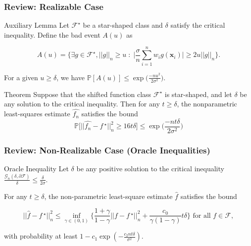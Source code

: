 \documentclass[11pt]{beamer}
\newcommand{\Prob}{\mathbb{P}}
\newcommand{\bx}{\mathbf{x}}
\newcommand{\cF}{\mathcal{F}}
\newcommand{\cG}{\mathcal{G}}
\newcommand{\fstar}{f\,^\star}
\newcommand{\fhat}{\widehat{f}}
\begin{document}
	\begin{frame}
		\frametitle{Review: Realizable Case}
		\begin{block}{Auxiliary Lemma}
			Let $\cF^\star$ be a star-shaped class and $\delta$ satisfy the critical inequality.  Define the bad event $A(u)$ as
			\begin{small}
				
				\vspace{-0.3cm}
				\begin{equation*}
				A(u) = \Bigg\{\exists g \in \cF^\star, ||g||_n \geq u \;:\; \Big|\frac{\sigma}{n}\sum_{i = 1}^{n} w_i g(\bx_i)\Big|\geq 2u ||g||_n\Bigg\}.
				\end{equation*}
			\end{small}
			\vspace{-0.3cm}
			
			For a given $u \geq \delta$, we have 
			$\Prob[A(u)]\leq \exp\big(\frac{-nu^2}{2\sigma^2}\big)$.
		\end{block}		
		\begin{block}{Theorem}
			Suppose that the shifted function class $\cF^\star$ is star-shaped, and let $\delta$ be any solution to the critical inequality. Then for any $t \geq \delta$, the nonparametric least-squares estimate $\widehat{f_n}$ satisfies the bound
			\begin{equation*}
			\Prob\big[||\widehat{f_n} - \fstar ||_n^2 \geq 16t\delta\big] \leq \exp\Big(\frac{-nt\delta}{2\sigma^2}\Big)
			\end{equation*}
		\end{block}		
	\end{frame}	

	\begin{frame}
	\frametitle{Review: Non-Realizable Case (Oracle Inequalities)}
	\begin{block}{Oracle Inequality}
		Let $\delta$ be any positive solution to the critical inequality
		$\frac{\cG_n(\delta, \partial \cF)}{\delta} \leq \frac{\delta}{2\sigma}.$
		
		For any $t\geq \delta$, the non-parametric least-square estimate $\fhat$ satisfies the bound
		\begin{small}
			\begin{equation*}
			||\fhat - \fstar||_n^2 \leq \inf_{\gamma \in (0, 1)}\Big\{\frac{1+\gamma}{1-\gamma} ||f-\fstar||_n^2 + \frac{c_0}{\gamma(1-\gamma)}t\delta\Big\} \text{  for all } f\in \cF, 
			\end{equation*}
		\end{small}
		with probability at least $1 - c_1 \exp(-\frac{c_2 n t\delta}{\sigma^2})$.			
	\end{block}		
	\end{frame}
\end{document}
